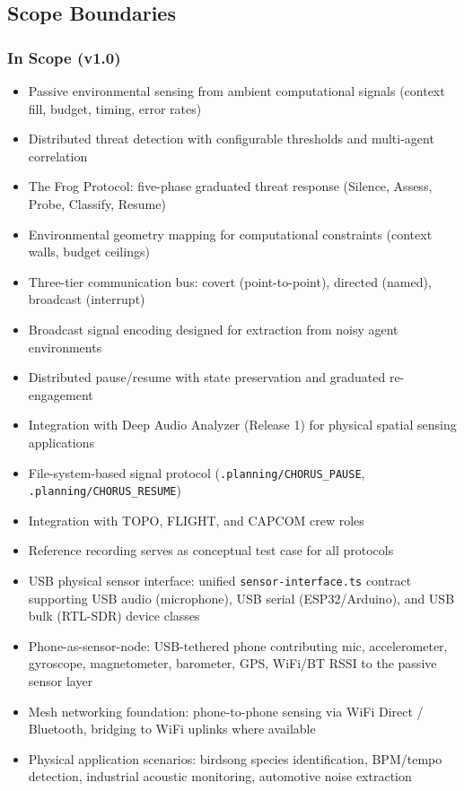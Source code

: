 \documentclass[11pt,letterpaper]{article}
\begin{document}
\subsection{Scope Boundaries}

\subsubsection{In Scope (v1.0)}

\begin{itemize}[leftmargin=2em]
\item Passive environmental sensing from ambient computational signals (context fill, budget, timing, error rates)
\item Distributed threat detection with configurable thresholds and multi-agent correlation
\item The Frog Protocol: five-phase graduated threat response (Silence, Assess, Probe, Classify, Resume)
\item Environmental geometry mapping for computational constraints (context walls, budget ceilings)
\item Three-tier communication bus: covert (point-to-point), directed (named), broadcast (interrupt)
\item Broadcast signal encoding designed for extraction from noisy agent environments
\item Distributed pause/resume with state preservation and graduated re-engagement
\item Integration with Deep Audio Analyzer (Release 1) for physical spatial sensing applications
\item File-system-based signal protocol (\texttt{.planning/CHORUS\_PAUSE}, \texttt{.planning/CHORUS\_RESUME})
\item Integration with TOPO, FLIGHT, and CAPCOM crew roles
\item Reference recording serves as conceptual test case for all protocols
\item USB physical sensor interface: unified \texttt{sensor-interface.ts} contract supporting USB audio (microphone), USB serial (ESP32/Arduino), and USB bulk (RTL-SDR) device classes
\item Phone-as-sensor-node: USB-tethered phone contributing mic, accelerometer, gyroscope, magnetometer, barometer, GPS, WiFi/BT RSSI to the passive sensor layer
\item Mesh networking foundation: phone-to-phone sensing via WiFi Direct / Bluetooth, bridging to WiFi uplinks where available
\item Physical application scenarios: birdsong species identification, BPM/tempo detection, industrial acoustic monitoring, automotive noise extraction

\end{itemize}
\end{document}
